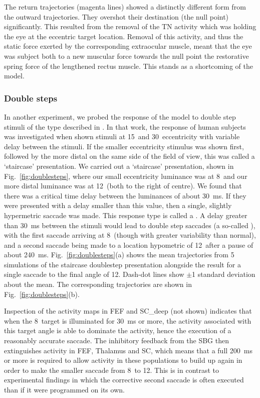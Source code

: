 \documentclass{frontiersSCNS}
\begin{document}
The return trajectories (magenta lines) showed a
distinctly different form from the outward trajectories. They overshot
their destination (the null point) significantly. This resulted from the
removal of the TN activity which was holding the eye at the eccentric
target location. Removal of this activity, and thus the static force
exerted by the corresponding extraocular muscle, meant that the eye
was subject both to a new muscular force towards the null point
 the restorative spring force of the lengthened rectus
muscle. This stands as a shortcoming of the model.

\subsubsection{Double steps}

In another experiment, we probed the response of the model to double step
stimuli of the type described in \cite{becker_analysis_1979}. In that
work, the response of human subjects was investigated when shown stimuli
at 15\dg~and 30\dg~eccentricity with variable delay between
the stimuli. If the smaller eccentricity stimulus was shown first, followed
by the more distal on the same side of the field of view, this was called
a `staircase' presentation.
We carried
out a `staircase' presentation, shown in Fig.~\ref{fig:doublesteps},
where our small eccentricity luminance was at 8\dg~and our more
distal luminance was at 12\dg~(both to the right of centre). We
found that there was a critical time delay between the luminances
of about 30~ms. If they were presented with a delay smaller than this
value, then a single, slightly hypermetric saccade was made. This
response type is called a . A delay greater
than 30~ms between the stimuli would lead to double step saccades
(a so-called ),
with the first saccade arriving at 8\dg~(though with greater
variability than normal), and a second saccade being made
to a location hypometric of 12\dg~after a pause of about 240~ms.
Fig.~\ref{fig:doublesteps}(a) shows the mean trajectories from 5 simulations
of the staircase doublestep presentation alongside the result for a
single saccade to the final angle of 12\dg. Dash-dot lines show
$\pm$1 standard deviation about the mean. The corresponding trajectories
are shown in Fig.~\ref{fig:doublesteps}(b).

Inspection of the activity maps in FEF and SC\_deep (not shown) indicates
that when
the 8\dg~target is illuminated for 30~ms or more, the activity
associated with this target angle is able to dominate the activity,
hence the execution of a reasonably accurate saccade. The inhibitory
feedback from the SBG then extinguishes activity in FEF, Thalamus and
SC, which means that a full 200~ms or more is required to allow
activity in these populations to build up again in order to make the
smaller saccade from 8\dg~to 12\dg. This is in contrast
to experimental findings in which the corrective second saccade is
often executed  than if it were programmed on its own.
\end{document}
